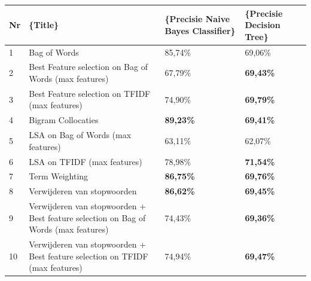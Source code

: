 \begin{table}[h]
\centering
\begin{adjustbox}{width=1\textwidth}
\begin{tabular}{|l|l|l|l|}
\hline
{\bf Nr} & \{\bf Title\}                                                                       & \{\bf Precisie Naive Bayes Classifier\} & \{\bf Precisie Decision Tree\} \\ \hline
1        & Bag of Words                                                                        & 85,74\%                                 & 69,06\%                        \\ \hline
2        & Best Feature selection on Bag of Words (max features)                               & 67,79\%                                 & {\bf 69,43\%}                  \\ \hline
3        & Best Feature selection on TFIDF (max features)                                      & 74,90\%                                 & {\bf 69,79\%}                  \\ \hline
4        & Bigram Collocaties                                                                  & {\bf 89,23\%}                           & {\bf 69,41\%}                  \\ \hline
5        & LSA on Bag of Words (max features)                                                  & 63,11\%                                 & 62,07\%                        \\ \hline
6        & LSA on TFIDF (max features)                                                         & 78,98\%                                 & {\bf 71,54\%}                  \\ \hline
7        & Term Weighting                                                                      & {\bf 86,75\%}                           & {\bf 69,76\%}                  \\ \hline
8        & Verwijderen van stopwoorden                                                         & {\bf 86,62\%}                           & {\bf 69,45\%}                  \\ \hline
9        & Verwijderen van stopwoorden + Best feature selection on Bag of Words (max features) & 74,43\%                                 & {\bf 69,36\%}                  \\ \hline
10       & Verwijderen van stopwoorden + Best feature selection on TFIDF (max features)        & 74,94\%                                 & {\bf 69,47\%}                  \\ \hline

\end{tabular}
\end{adjustbox}
\end{table}
